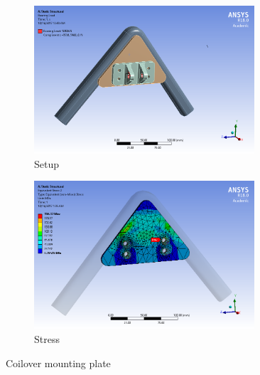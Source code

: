 \documentclass[10pt]{article}
\begin{document}
\begin{figure}[H]
\centering
\begin{subfigure}[b]{.48\textwidth}
\centering
\includegraphics[width=0.9\textwidth]{figures/fea/parts/MS00038-CoiloverMountingPlate-Setup}
\caption{Setup}
\end{subfigure}
\begin{subfigure}[b]{.48\textwidth}
\centering
\includegraphics[width=0.9\textwidth]{figures/fea/parts/MS00038-CoiloverMountingPlate-Stress}
\caption{Stress}
\end{subfigure}
\caption{Coilover mounting plate}
\label{fig:MS00038-CoiloverMountingPlate}
\end{figure}
\end{document}
